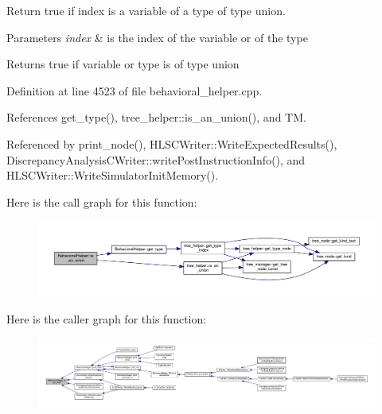 Return true if index is a variable of a type of type union. 


\begin{DoxyParams}{Parameters}
{\em index} & is the index of the variable or of the type \\
\hline
\end{DoxyParams}
\begin{DoxyReturn}{Returns}
true if variable or type is of type union 
\end{DoxyReturn}


Definition at line 4523 of file behavioral\+\_\+helper.\+cpp.



References get\+\_\+type(), tree\+\_\+helper\+::is\+\_\+an\+\_\+union(), and TM.



Referenced by print\+\_\+node(), H\+L\+S\+C\+Writer\+::\+Write\+Expected\+Results(), Discrepancy\+Analysis\+C\+Writer\+::write\+Post\+Instruction\+Info(), and H\+L\+S\+C\+Writer\+::\+Write\+Simulator\+Init\+Memory().

Here is the call graph for this function\+:
\nopagebreak
\begin{figure}[H]
\begin{center}
\leavevmode
\includegraphics[width=350pt]{dd/db2/classBehavioralHelper_a0d2138dc05ca289fb0bd62ebfb09f476_cgraph}
\end{center}
\end{figure}
Here is the caller graph for this function\+:
\nopagebreak
\begin{figure}[H]
\begin{center}
\leavevmode
\includegraphics[width=350pt]{dd/db2/classBehavioralHelper_a0d2138dc05ca289fb0bd62ebfb09f476_icgraph}
\end{center}
\end{figure}
\mbox{\label{classBehavioralHelper_a50ae88f9b0101175e72f66e8010ef88e}} 

